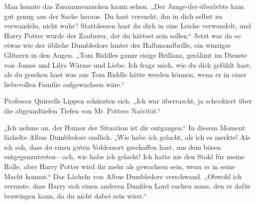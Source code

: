 Man konnte das Zusammenzucken kaum sehen.
„Der Junge-der-überlebte kam gut genug aus der Sache heraus. Du hast versucht, ihn in dich selbst zu verwandeln, nicht wahr? Stattdessen hast du dich in eine Leiche verwandelt, und Harry Potter wurde der Zauberer, der du hättest sein sollen.“
Jetzt war da so etwas wie der übliche Dumbledore hinter der Halbmondbrille, ein winziges Glitzern in den Augen.
„Tom Riddles ganze eisige Brillanz, gezähmt im Dienste von James und Lilys Wärme und Liebe. Ich frage mich, wie du dich gefühlt hast, als du gesehen hast was aus Tom Riddle hätte werden können, wenn er in einer liebevollen Familie aufgewachsen wäre.“

Professor Quirrells Lippen schürzten sich.
„Ich war überrascht, ja schockiert über die abgrundtiefen Tiefen von Mr~Potters Naivität.“

„Ich nehme an, der Humor der Situation ist dir entgangen.“
In diesem Moment lächelte Albus Dumbledore endlich.
„Wie habe ich gelacht, als ich es merkte! Als ich sah, dass du einen guten Voldemort geschaffen hast, um dem bösen entgegenzutreten—ach, wie habe ich gelacht! Ich hatte nie den Stahl für meine Rolle, aber Harry Potter wird ihr mehr als gewachsen sein, wenn er in seine Macht kommt.“
Das Lächeln von Albus Dumbledore verschwand.
„Obwohl ich vermute, dass Harry sich einen anderen Dunklen Lord suchen muss, den er dafür bezwingen kann, da du nicht dabei sein wirst.“

